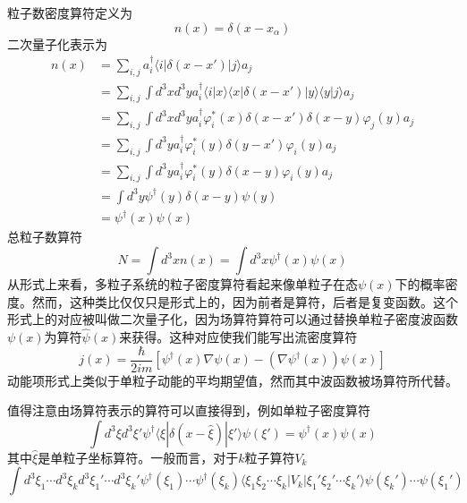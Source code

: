 \documentclass[12pt]{article}
\begin{document}
粒子数密度算符定义为
\begin{equation*}
    n(x)=\delta(x-x_\alpha)
\end{equation*}
二次量子化表示为
\begin{equation*}
    \begin{split}
        n(x)&=\sum_{i,j}a_i^\dagger\langle i|\delta(x-x')|j\rangle a_j\\
        &=\sum_{i,j}\int d^3xd^3y a_i^\dagger\langle i|x\rangle\langle x|\delta(x-x')|y\rangle\langle y|j\rangle a_j\\
        &=\sum_{i,j}\int d^3xd^3y a_i^\dagger\varphi_i^*(x)\delta(x-x')\delta(x-y)\varphi_j(y)a_j\\
        &=\sum_{i,j}\int d^3ya_i^\dagger\varphi_i^*(y)\delta(y-x')\varphi_i(y)a_j\\
        &=\sum_{i,j}\int d^3ya_i^\dagger\varphi_i^*(y)\delta(x-y)\varphi_i(y)a_j\\
        &=\int d^3y\psi^\dagger(y)\delta(x-y)\psi(y)\\
        &=\psi^\dagger(x)\psi(x)
    \end{split}
\end{equation*}
总粒子数算符
\begin{equation*}
    N=\int d^3xn(x)=\int d^3x\psi^\dagger(x)\psi(x)
\end{equation*}
从形式上来看，多粒子系统的粒子密度算符看起来像单粒子在态$\psi(x)$下的概率密度。然而，这种类比仅仅只是形式上的，因为前者是算符，后者是复变函数。这个形式上的对应被叫做二次量子化，因为场算符算符可以通过替换单粒子密度波函数$\psi(x)$为算符$\hat{\psi}(x)$来获得。这种对应使我们能写出流密度算符
\begin{equation*}
    j(x)=\frac{\hbar}{2im}[\psi^\dagger(x)\nabla\psi(x)-(\nabla\psi^\dagger(x))\psi(x)]
\end{equation*}
动能项形式上类似于单粒子动能的平均期望值，然而其中波函数被场算符所代替。

值得注意由场算符表示的算符可以直接得到，例如单粒子密度算符
\begin{equation*}
    \int d^3\xi d^3\xi'\psi^\dagger\langle\xi|\delta(x-\hat{\xi})|\xi'\rangle\psi(\xi')=\psi^\dagger(x)\psi(x)
\end{equation*}
其中$\hat{\xi}$是单粒子坐标算符。一般而言，对于$k$粒子算符$V_k$
\begin{equation*}
    \int d^3\xi_1\cdots d^3\xi_kd^3\xi_1'\cdots d^3\xi_k'\psi^\dagger(\xi_1)\cdots\psi^\dagger(\xi_k)\langle\xi_1\xi_2\cdots\xi_k|V_k|\xi_1'\xi_2'\cdots\xi_k'\rangle\psi(\xi_k')\cdots\psi(\xi_1')
\end{equation*}
\end{document}
